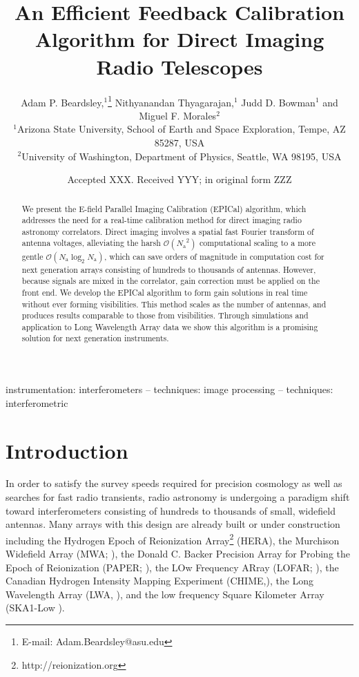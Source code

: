 \documentclass[a4paper,fleqn,usenatbib]{mnras}
\title[EPICal]{An Efficient Feedback Calibration Algorithm for Direct Imaging Radio Telescopes
}
\author[Beardsley et al.]{
Adam P. Beardsley,$^{1}$\thanks{E-mail: Adam.Beardsley@asu.edu}
Nithyanandan Thyagarajan,$^{1}$
Judd D. Bowman$^{1}$
\newauthor
and Miguel F. Morales$^{2}$
\\
$^{1}$Arizona State University, School of Earth and Space Exploration, Tempe, AZ 85287, USA\\
$^{2}$University of Washington, Department of Physics, Seattle, WA 98195, USA\\
}
\date{Accepted XXX. Received YYY; in original form ZZZ}
\newcommand{\Nant}{\ensuremath{N_{\mathrm{a}}}}
\begin{document}
\label{firstpage}
\pagerange{\pageref{firstpage}--\pageref{lastpage}}
\maketitle

\begin{abstract}
We present the E-field Parallel Imaging Calibration (EPICal) algorithm, which addresses the need for a real-time calibration method for direct imaging radio astronomy correlators. Direct imaging involves a spatial fast Fourier transform of antenna voltages, alleviating the harsh $\mathcal{O}(\Nant^2)$ computational scaling to a more gentle $\mathcal{O}(\Nant \log_2 \Nant)$, which can save orders of magnitude in computation cost for next generation arrays consisting of hundreds to thousands of antennas. However, because signals are mixed in the correlator, gain correction must be applied on the front end. We develop the EPICal algorithm to form gain solutions in real time without ever forming visibilities. This method scales as the number of antennas, and produces results comparable to those from visibilities. Through simulations and application to Long Wavelength Array data we show this algorithm is a promising solution for next generation instruments.
\end{abstract}

\begin{keywords}
instrumentation: interferometers -- techniques: image processing -- techniques: interferometric
\end{keywords}



\section{Introduction}
In order to satisfy the survey speeds required for precision cosmology as well as searches for fast radio transients, radio astronomy is undergoing a paradigm shift toward interferometers consisting of hundreds to thousands of small, widefield antennas. Many arrays with this design are already built or under construction including the Hydrogen Epoch of Reionization Array\footnote{http://reionization.org} (HERA), the Murchison Widefield Array (MWA; \citealt{tin13,bow13}), the Donald C. Backer Precision Array for Probing the Epoch of Reionization (PAPER; \citealt{par10}), the LOw Frequency ARray (LOFAR; \citealt{van13}), the Canadian Hydrogen Intensity Mapping Experiment (CHIME,\citealt{ban14}), the Long Wavelength Array (LWA, \citealt{ell13}), and the low frequency Square Kilometer Array (SKA1-Low \citealt{mel13}).
\end{document}
